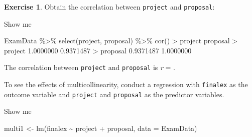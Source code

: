 \documentclass[
]{book}
\newenvironment{Shaded}{\begin{snugshade}}{\end{snugshade}}
\newcommand{\AttributeTok}[1]{\textcolor[rgb]{0.77,0.63,0.00}{#1}}
\newcommand{\FloatTok}[1]{\textcolor[rgb]{0.00,0.00,0.81}{#1}}
\newcommand{\FunctionTok}[1]{\textcolor[rgb]{0.00,0.00,0.00}{#1}}
\newcommand{\NormalTok}[1]{#1}
\newcommand{\OtherTok}[1]{\textcolor[rgb]{0.56,0.35,0.01}{#1}}
\newcommand{\SpecialCharTok}[1]{\textcolor[rgb]{0.00,0.00,0.00}{#1}}
\theoremstyle{definition}
\theoremstyle{definition}
\theoremstyle{definition}
\newtheorem{exercise}{Exercise}[chapter]
\theoremstyle{definition}
\theoremstyle{remark}
\begin{document}
\begin{exercise}

Obtain the correlation between \texttt{project} and \texttt{proposal}:

Show me

\begin{Shaded}
\begin{Highlighting}[]
\NormalTok{ExamData }\SpecialCharTok{\%\textgreater{}\%} 
  \FunctionTok{select}\NormalTok{(project, proposal) }\SpecialCharTok{\%\textgreater{}\%} 
  \FunctionTok{cor}\NormalTok{()}
\SpecialCharTok{\textgreater{}}\NormalTok{            project  proposal}
\SpecialCharTok{\textgreater{}}\NormalTok{ project  }\FloatTok{1.0000000} \FloatTok{0.9371487}
\SpecialCharTok{\textgreater{}}\NormalTok{ proposal }\FloatTok{0.9371487} \FloatTok{1.0000000}
\end{Highlighting}
\end{Shaded}

The correlation between \texttt{project} and \texttt{proposal} is \emph{r} = .

To see the effects of multicollinearity, conduct a regression with \texttt{finalex} as the outcome variable and \texttt{project} and \texttt{proposal} as the predictor variables.

Show me

\begin{Shaded}
\begin{Highlighting}[]
\NormalTok{multi1 }\OtherTok{\textless{}{-}} \FunctionTok{lm}\NormalTok{(finalex }\SpecialCharTok{\textasciitilde{}}\NormalTok{ project }\SpecialCharTok{+}\NormalTok{ proposal, }\AttributeTok{data =}\NormalTok{ ExamData)}


\end{Highlighting}
\end{Shaded}
\end{exercise}
\end{document}
